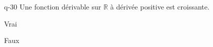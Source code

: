 \begin{truefalse}{q-30}
Une fonction dérivable  sur $\mathbb R$ à dérivée positive est croissante.
\item* Vrai
\item Faux
\end{truefalse}

